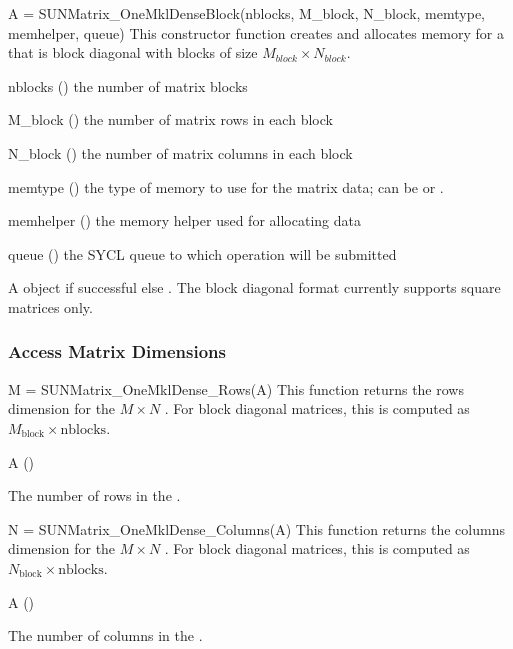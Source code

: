 {
  A = SUNMatrix\_OneMklDenseBlock(nblocks, M\_block, N\_block, memtype, memhelper, queue)
}
{
  This constructor function creates and allocates memory for a 
   that is block diagonal with  blocks of size
  $M_{block} \times N_{block}$.
}
{
  \begin{args}[memhelper]
  \item[nblocks] () the number of matrix blocks
  \item[M\_block] () the number of matrix rows in each block
  \item[N\_block] () the number of matrix columns in each block
  \item[memtype] () the type of memory to use for the matrix data; can be  or .
  \item[memhelper] () the memory helper used for allocating data
  \item[queue] () the SYCL queue to which operation will be submitted
  \end{args}
}
{
  A  object if successful else .
}
{
  The block diagonal format currently supports square matrices only.
}


\subsubsection*{Access Matrix Dimensions}


{
  M = SUNMatrix\_OneMklDense\_Rows(A)
}
{
  This function returns the rows dimension for the $M \times N$ .
  For block diagonal matrices, this is computed as $M_{\text{block}} \times \text{nblocks}$.
}
{
  \begin{args}
  \item[A] ()
  \end{args}
}
{
  The number of rows in the .
}
{}


{
  N = SUNMatrix\_OneMklDense\_Columns(A)
}
{
  This function returns the columns dimension for the $M \times N$ .
  For block diagonal matrices, this is computed as $N_{\text{block}} \times \text{nblocks}$.
}
{
  \begin{args}
  \item[A] ()
  \end{args}
}
{
  The number of columns in the .
}
{}


